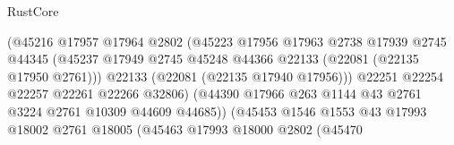 \begin{lexlean}{RustCore}
\begin{coremodule}
                                          (@45216
                                            @17957
                                            @17964
                                            @2802
                                            (@45223
                                              @17956
                                              @17963
                                              @2738
                                              @17939
                                              @2745
                                              @44345
                                              (@45237
                                                @17949
                                                @2745
                                                @45248
                                                @44366
                                                @22133
                                                (@22081 (@22135 @17950 @2761)))
                                              @22133
                                              (@22081 (@22135 @17940 @17956)))
                                            @22251
                                            @22254
                                            @22257
                                            @22261
                                            @22266
                                            @32806)
                                          (@44390
                                            @17966
                                            @263
                                            @1144
                                            @43
                                            @2761
                                            @3224
                                            @2761
                                            @10309
                                            @44609
                                            @44685))
                                        (@45453
                                          @1546
                                          @1553
                                          @43
                                          @17993
                                          @18002
                                          @2761
                                          @18005
                                          (@45463
                                            @17993
                                            @18000
                                            @2802
                                            (@45470

\end{coremodule}
\end{lexlean}
